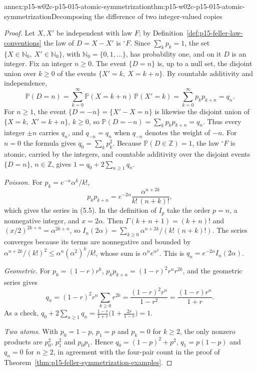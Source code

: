 \begin{annexitem}{annex:p15-w02c-p15-015-atomic-symmetrization}{thm:p15-w02c-p15-015-atomic-symmetrization}{Decomposing the difference of two integer-valued copies}
\begin{proof}
Let \(X,X'\) be independent with law \(F\); by
Definition~\ref{def:p15-feller-law-conventions} the law of
\(D=X-X'\) is \({}^{\circ}F\). Since \(\sum_kp_k=1\), the set
\(\{X\in\mathbb N_0,\ X'\in\mathbb N_0\}\), with
\(\mathbb N_0=\{0,1,\ldots\}\), has probability one, and on it \(D\)
is an integer. Fix an integer \(n\geq0\). The event \(\{D=n\}\) is, up
to a null set, the disjoint union over \(k\geq0\) of the events
\(\{X'=k,\ X=k+n\}\). By countable additivity and independence,
\[
 \mathbb P(D=n)=\sum_{k=0}^\infty\mathbb P(X=k+n)\,\mathbb P(X'=k)
              =\sum_{k=0}^\infty p_kp_{k+n}=q_n.
\]
For \(n\geq1\), the event \(\{D=-n\}=\{X'-X=n\}\) is likewise the
disjoint union of \(\{X=k,\ X'=k+n\}\), \(k\geq0\), so
\(\mathbb P(D=-n)=\sum_kp_kp_{k+n}=q_n\). Thus every integer \(\pm n\)
carries \(q_n\), and \(q_{-n}=q_n\) when \(q_{-n}\) denotes the weight
of \(-n\). For \(n=0\) the formula gives \(q_0=\sum_kp_k^2\). Because
\(\mathbb P(D\in\mathbb Z)=1\), the law \({}^{\circ}F\) is atomic,
carried by the integers, and countable additivity over the disjoint
events \(\{D=n\}\), \(n\in\mathbb Z\), gives
\(1=q_0+2\sum_{n\geq1}q_n\).

\emph{Poisson.} For \(p_k=e^{-\alpha}\alpha^k/k!\),
\[
 p_kp_{k+n}=e^{-2\alpha}\frac{\alpha^{n+2k}}{k!\,(n+k)!},
\]
which gives the series in (5.5). In the definition of \(I_p\) take
the order \(p=n\), a nonnegative integer, and \(x=2\alpha\). Then
\(\Gamma(k+n+1)=(k+n)!\) and \((x/2)^{2k+n}=\alpha^{2k+n}\), so
\(I_n(2\alpha)=\sum_{k\geq0}\alpha^{n+2k}/(k!\,(n+k)!)\). The series
converges because its terms are nonnegative and bounded by
\(\alpha^{n+2k}/(k!)^2\leq\alpha^n(\alpha^2)^k/k!\), whose sum is
\(\alpha^ne^{\alpha^2}\). This is \(q_n=e^{-2\alpha}I_n(2\alpha)\).

\emph{Geometric.} For \(p_k=(1-r)r^k\),
\(p_kp_{k+n}=(1-r)^2r^nr^{2k}\), and the geometric series gives
\[
 q_n=(1-r)^2r^n\sum_{k\geq0}r^{2k}=\frac{(1-r)^2r^n}{1-r^2}
    =\frac{(1-r)r^n}{1+r}.
\]
As a check,
\(q_0+2\sum_{n\geq1}q_n=\frac{1-r}{1+r}\bigl(1+\frac{2r}{1-r}\bigr)=1\).

\emph{Two atoms.} With \(p_0=1-p\), \(p_1=p\) and \(p_k=0\) for
\(k\geq2\), the only nonzero products are \(p_0^2\), \(p_1^2\) and
\(p_0p_1\). Hence \(q_0=(1-p)^2+p^2\), \(q_1=p(1-p)\) and \(q_n=0\)
for \(n\geq2\), in agreement with the four-pair count in the proof of
Theorem~\ref{thm:p15-feller-symmetrization-examples}.
\end{proof}
\end{annexitem}

